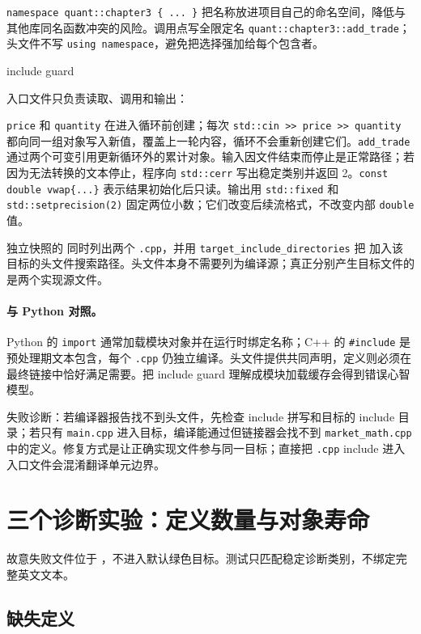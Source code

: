 \texttt{namespace quant::chapter3 \{ ... \}} 把名称放进项目自己的命名空间，降低与其他库同名函数冲突的风险。调用点写全限定名 \texttt{quant::chapter3::add\_trade}；头文件不写 \texttt{using namespace}，避免把选择强加给每个包含者。

include guard

入口文件只负责读取、调用和输出：



\texttt{price} 和 \texttt{quantity} 在进入循环前创建；每次 \texttt{std::cin >> price >> quantity} 都向同一组对象写入新值，覆盖上一轮内容，循环不会重新创建它们。\texttt{add\_trade} 通过两个可变引用更新循环外的累计对象。输入因文件结束而停止是正常路径；若因为无法转换的文本停止，程序向 \texttt{std::cerr} 写出稳定类别并返回 2。\texttt{const double vwap\{...\}} 表示结果初始化后只读。输出用 \texttt{std::fixed} 和 \texttt{std::setprecision(2)} 固定两位小数；它们改变后续流格式，不改变内部 \texttt{double} 值。

独立快照的  同时列出两个 \texttt{.cpp}，并用 \texttt{target\_include\_directories} 把  加入该目标的头文件搜索路径。头文件本身不需要列为编译源；真正分别产生目标文件的是两个实现源文件。

\paragraph{与 Python 对照。}
Python 的 \texttt{import} 通常加载模块对象并在运行时绑定名称；C++ 的 \texttt{\#include} 是预处理期文本包含，每个 \texttt{.cpp} 仍独立编译。头文件提供共同声明，定义则必须在最终链接中恰好满足需要。把 include guard 理解成模块加载缓存会得到错误心智模型。

失败诊断：若编译器报告找不到头文件，先检查 include 拼写和目标的 include 目录；若只有 \texttt{main.cpp} 进入目标，编译能通过但链接器会找不到 \texttt{market\_math.cpp} 中的定义。修复方式是让正确实现文件参与同一目标；直接把 \texttt{.cpp} include 进入入口文件会混淆翻译单元边界。

\section{三个诊断实验：定义数量与对象寿命}

故意失败文件位于 ，不进入默认绿色目标。测试只匹配稳定诊断类别，不绑定完整英文文本。

\subsection{缺失定义}

